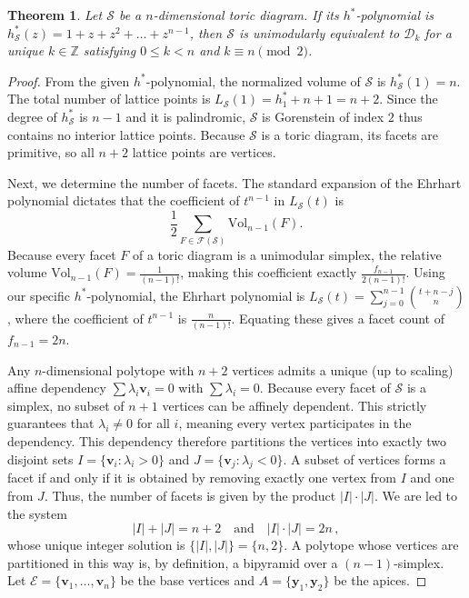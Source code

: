 \documentclass[a4paper,11pt,reqno]{amsart}
\newcommand{\Z}{\mathbb Z}
\newcommand{\Ss}{{\mathcal S}}
\newcommand{\Ee}{{\mathcal E}}
\newtheorem{theorem}{Theorem}[section]
\begin{document}
\begin{theorem} \label{thm:bipysimplex2}
Let $\Ss$ be a $n$-dimensional toric diagram. If its $h^*$-polynomial is $h_{\Ss}^\ast (z) = 1 + z + z^2 + \dots + z^{n-1}$, 
then $\Ss$ is unimodularly equivalent to $\mathcal{D}_k$ for a unique $k\in\Z$ satisfying $0 \le k < n$ and 
$k \equiv n \pmod 2$.
\end{theorem}
\begin{proof}
From the given $h^\ast$-polynomial, the normalized volume of $\Ss$ is $h_{\Ss}^\ast(1) = n$. 
The total number of lattice points is $L_{\Ss}(1) = h_1^\ast + n + 1 = n+2$. Since the degree of 
$h_{\Ss}^\ast$ is $n-1$ and it is palindromic, $\Ss$ is Gorenstein of index $2$ thus contains no interior 
lattice points. Because $\Ss$ is a toric diagram, its facets are primitive, so all $n+2$ lattice points are vertices.
		
Next, we determine the number of facets. The standard expansion of the Ehrhart polynomial dictates that the 
coefficient of $t^{n-1}$ in $L_{\Ss}(t)$ is
\[
\frac{1}{2} \sum_{F \in \mathcal{F}(\Ss)} \text{Vol}_{n-1}(F). 
\]
Because every facet $F$ of a toric diagram is a unimodular simplex, the relative volume 
$\text{Vol}_{n-1}(F) = \frac{1}{(n-1)!}$, making this coefficient exactly $\frac{f_{n-1}}{2(n-1)!}$. Using our specific 
$h^\ast$-polynomial, the Ehrhart polynomial is $L_{\Ss}(t) = \sum_{j=0}^{n-1} \binom{t+n-j}{n}$, where the coefficient 
of $t^{n-1}$ is $\frac{n}{(n-1)!}$. Equating these gives a facet count of $f_{n-1} = 2n$.
		
Any $n$-dimensional polytope with $n+2$ vertices admits a unique (up to scaling) affine dependency 
$\sum \lambda_i \bm{v}_i = 0$ with $\sum \lambda_i = 0$. Because every facet of $\Ss$ is a simplex, no subset of 
$n+1$ vertices can be affinely dependent. This strictly guarantees that $\lambda_i \neq 0$ for all $i$, meaning every vertex 
participates in the dependency. This dependency therefore partitions the vertices into exactly two disjoint sets 
$I = \{\bm{v}_i : \lambda_i > 0\}$ and $J = \{\bm{v}_j : \lambda_j < 0\}$. A subset of vertices forms a facet if and only if it is 
obtained by removing exactly one vertex from $I$ and one from $J$. Thus, the number of facets is given by the product 
$|I| \cdot |J|$. We are led to the system
\[ 
|I| + |J| = n+2 \quad \text{and} \quad |I| \cdot |J| = 2n\,,
\]
whose unique integer solution is $\{|I|, |J|\} = \{n, 2\}$. A polytope whose vertices are partitioned in this way is, 
by definition, a bipyramid over a $(n-1)$-simplex. Let $\Ee = \{\bm{v}_1, \dots, \bm{v}_n\}$ be the base vertices and 
$A = \{\bm{y}_1, \bm{y}_2\}$ be the apices.
		

\end{proof}
\end{document}
